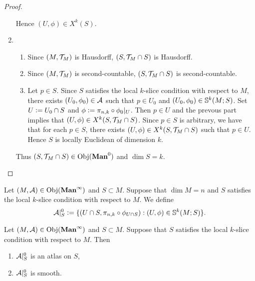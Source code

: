 \documentclass{book}
\begin{document}
\begin{proof}
\begin{enumerate}
\begin{enumerate}
			\end{enumerate}
			Hence $(U, \phi) \in X^k(S)$.
			\item 
			\begin{enumerate}
				\item Since $(M, \MT_M)$ is Hausdorff, $(S, \MT_M \cap S)$ is Hausdorff.
				\item Since $(M, \MT_M)$ is second-countable, $(S, \MT_M \cap S)$ is second-countable.
				\item Let $p \in S$. Since $S$ satisfies the local $k$-slice condition with respect to $M$, there exists $(U_0, \phi_0) \in \MA$ such that $p \in U_0$ and $(U_0, \phi_0) \in \S^k(M; S)$. Set $U \defeq U_0 \cap S$ and $\phi \defeq \pi_{n,k} \circ \phi_0|_U$. Then $p \in U$ and the prevous part implies that $(U, \phi) \in X^k(S, \MT_M \cap S)$. Since $p \in S$ is arbitrary, we have that for each $p \in S$, there exists $(U, \phi) \in X^k(S, \MT_M \cap S)$ such that $p \in U$. Hence $S$ is locally Euclidean of dimension $k$. 
			\end{enumerate}
			Thus $(S, \MT_M \cap S) \in \Obj(\Man0)$ and $\dim S = k$.
		\end{enumerate}
	\end{proof}

	\begin{defn}
		Let $(M, \MA) \in \Obj(\Maninf)$ and $S \subset M$. Suppose that $\dim M = n$ and $S$ satisfies the local $k$-slice condition with respect to $M$. We define 
		$$\MA|_S^0 \defeq \{(U \cap S, \pi_{n,k} \circ \phi_{U \cap S}): (U, \phi) \in \S^k(M; S)\}.$$
	\end{defn}

	\begin{ex}
		Let $(M, \MA) \in \Obj(\Maninf)$ and $S \subset M$. Suppose that $S$ satisfies the local $k$-slice condition with respect to $M$. Then 
		\begin{enumerate}
			\item $\MA|_S^0$ is an atlas on $S$,
			\item $\MA|_S^0$ is smooth.
		\end{enumerate}
	\end{ex}
	
\end{document}
